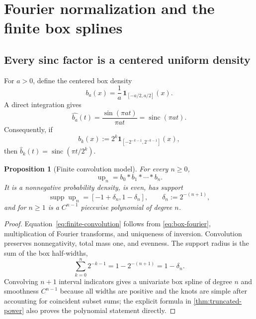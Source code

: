\documentclass[11pt,a4paper]{article}
\newtheorem{proposition}[theorem]{Proposition}
\theoremstyle{remark}
\newcommand{\up}{\operatorname{up}}
\newcommand{\sinc}{\operatorname{sinc}}
\newcommand{\supp}{\operatorname{supp}}
\begin{document}
\section{Fourier normalization and the finite box splines}
\label{sec:box-splines}

\subsection{Every sinc factor is a centered uniform density}

For $a>0$, define the centered box density
\begin{equation}
 b_a(x)=\frac1a\,\mathbf 1_{[-a/2,a/2]}(x).
 \label{eq:box-density}
\end{equation}
A direct integration gives
\begin{equation}
 \widehat{b_a}(t)=\frac{\sin(\pi at)}{\pi at}=\sinc(\pi at).
 \label{eq:box-fourier}
\end{equation}
Consequently, if
\begin{equation}
 b_k(x):=2^k\mathbf 1_{[-2^{-k-1},2^{-k-1}]}(x),
 \label{eq:dyadic-box}
\end{equation}
then $\widehat b_k(t)=\sinc(\pi t/2^k)$.

\begin{proposition}[Finite convolution model]
\label{prop:finite-convolution}
For every $n\ge0$,
\begin{equation}
 \up_n=b_0*b_1*\cdots*b_n.
 \label{eq:finite-convolution}
\end{equation}
It is a nonnegative probability density, is even, has support
\begin{equation}
 \supp\up_n=[-1+\delta_n,1-\delta_n],
 \qquad \delta_n:=2^{-(n+1)},
 \label{eq:prefix-support}
\end{equation}
and for $n\ge1$ is a $C^{n-1}$ piecewise polynomial of degree $n$.
\end{proposition}

\begin{proof}
Equation~\eqref{eq:finite-convolution} follows from
\eqref{eq:box-fourier}, multiplication of Fourier transforms, and uniqueness
of inversion.  Convolution preserves nonnegativity, total mass one, and
evenness.  The support radius is the sum of the box half-widths,
\[
 \sum_{k=0}^{n}2^{-k-1}=1-2^{-(n+1)}=1-\delta_n.
\]
Convolving $n+1$ interval indicators gives a univariate box spline of degree
$n$ and smoothness $C^{n-1}$ because all widths are positive and the knots are
simple after accounting for coincident subset sums; the explicit formula in
\cref{thm:truncated-power} also proves the polynomial statement directly.
\end{proof}
\end{document}
